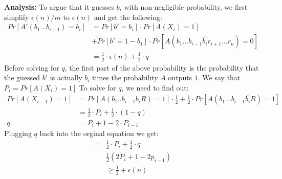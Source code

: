 \documentclass[11pt]{article}
\begin{document}
\textbf{Analysis:} To argue that it guesses $b_i$ with non-negligible probability, we first simplify $\epsilon(n)/m$ to $\epsilon(n)$ and get the following:
\begin{align*}
    Pr[A'(b_1...b_{i-1})=b_i] &= Pr[b'=b_i] \cdot Pr[A(X_{i}) = 1]\\
    &+ Pr[b'=1-b_1] \cdot Pr[A(b_1...b_{i-1}\hat{b_i}r_{i+1}...r_n)=0]\\
    &= \frac{1}{2} \cdot \epsilon(n) + \frac{1}{2} \cdot q
\end{align*}
Before solving for $q$, the first part of the above probability is the probability that the guessed $b'$ is actually $b_i$ times the probability $A$ outputs $1$. We say that $P_i = Pr[A(X_i) = 1]$ To solve for $q$, we need to find out:
\begin{align*}
    Pr[A(X_{i-1})=1] &= Pr[A(b_1..b_{i-1}b_iR) = 1] \cdot \frac{1}{2} + \frac{1}{2}\cdot Pr[A(b_1...b_{i-1}\overline{b_i}R) = 1]\\
    &= \frac{1}{2} \cdot P_i + \frac{1}{2} \cdot (1-q)\\
    q &= P_{i} + 1 - 2 \cdot P_{i-1}
\end{align*}
Plugging $q$ back into the orginal equation we get:
\begin{align*}
    = &\frac{1}{2} \cdot P_i + \frac{1}{2} \cdot q\\
    & \frac{1}{2}(2P_i+1-2p_{i-1})\\
    &\geq \frac{1}{2} + \epsilon(n)
\end{align*}
\end{document}
